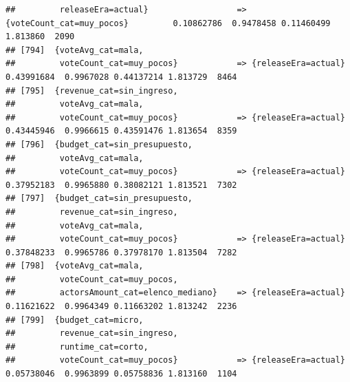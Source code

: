 \documentclass[
]{article}
\begin{document}
\begin{verbatim}
##         releaseEra=actual}                  => {voteCount_cat=muy_pocos}         0.10862786  0.9478458 0.11460499 1.813860  2090
## [794]  {voteAvg_cat=mala,                                                                                                       
##         voteCount_cat=muy_pocos}            => {releaseEra=actual}               0.43991684  0.9967028 0.44137214 1.813729  8464
## [795]  {revenue_cat=sin_ingreso,                                                                                                
##         voteAvg_cat=mala,                                                                                                       
##         voteCount_cat=muy_pocos}            => {releaseEra=actual}               0.43445946  0.9966615 0.43591476 1.813654  8359
## [796]  {budget_cat=sin_presupuesto,                                                                                             
##         voteAvg_cat=mala,                                                                                                       
##         voteCount_cat=muy_pocos}            => {releaseEra=actual}               0.37952183  0.9965880 0.38082121 1.813521  7302
## [797]  {budget_cat=sin_presupuesto,                                                                                             
##         revenue_cat=sin_ingreso,                                                                                                
##         voteAvg_cat=mala,                                                                                                       
##         voteCount_cat=muy_pocos}            => {releaseEra=actual}               0.37848233  0.9965786 0.37978170 1.813504  7282
## [798]  {voteAvg_cat=mala,                                                                                                       
##         voteCount_cat=muy_pocos,                                                                                                
##         actorsAmount_cat=elenco_mediano}    => {releaseEra=actual}               0.11621622  0.9964349 0.11663202 1.813242  2236
## [799]  {budget_cat=micro,                                                                                                       
##         revenue_cat=sin_ingreso,                                                                                                
##         runtime_cat=corto,                                                                                                      
##         voteCount_cat=muy_pocos}            => {releaseEra=actual}               0.05738046  0.9963899 0.05758836 1.813160  1104

\end{verbatim}
\end{document}
